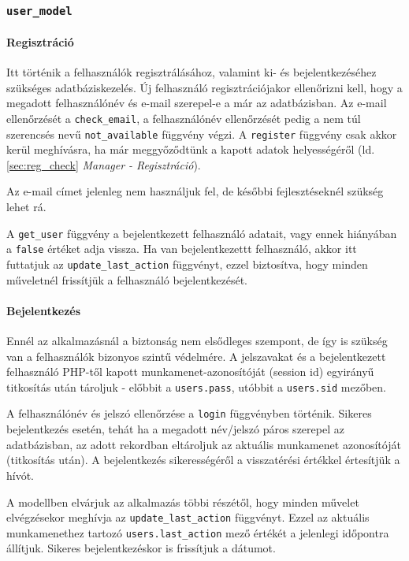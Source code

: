 \documentclass[12pt,a4paper,twoside]{article}
\begin{document}
\subsubsection{\texttt{user\_model}}

\paragraph{Regisztráció}
Itt történik a felhasználók regisztrálásához, valamint ki- és bejelentkezéséhez
szükséges adatbáziskezelés. Új felhasználó regisztrációjakor ellenőrizni
kell, hogy a megadott felhasználónév és e-mail szerepel-e a már az
adatbázisban. Az e-mail ellenőrzését a \texttt{check\_email}, a felhasználónév
ellenőrzését pedig a nem túl szerencsés nevű \texttt{not\_available} függvény
végzi. A \texttt{register} függvény csak akkor kerül meghívásra, ha már
meggyőződtünk a kapott adatok helyességéről (ld. \ref{sec:reg_check} \textit{Manager -
Regisztráció}).

Az e-mail címet jelenleg nem használjuk fel, de későbbi fejlesztéseknél szükség
lehet rá.

A \texttt{get\_user} függvény a bejelentkezett felhasználó adatait, vagy ennek
hiányában a \texttt{false} értéket adja vissza. Ha van bejelentkezettt
felhasználó, akkor itt futtatjuk az \texttt{update\_last\_action} függvényt,
ezzel biztosítva, hogy minden műveletnél frissítjük a felhasználó
bejelentkezését.

\paragraph{Bejelentkezés}
Ennél az alkalmazásnál a biztonság nem elsődleges szempont, de
így is szükség van a felhasználók bizonyos szintű védelmére. A jelszavakat és
a bejelentkezett felhasználó PHP-től kapott munkamenet-azonosítóját (session
id\cite{PHP-SID}) egyirányű titkosítás után tároljuk - előbbit a
\texttt{users.pass}, utóbbit a \texttt{users.sid} mezőben.

A felhasználónév és jelszó ellenőrzése a \texttt{login} függvényben
történik. Sikeres bejelentkezés esetén, tehát ha a megadott név/jelszó páros
szerepel az adatbázisban, az adott rekordban eltároljuk az aktuális munkamenet
azonosítóját (titkosítás után). A bejelentkezés sikerességéről a visszatérési
értékkel értesítjük a hívót.

A modellben elvárjuk az alkalmazás többi részétől, hogy minden művelet
elvégzésekor meghívja az \texttt{update\_last\_action} függvényt. Ezzel az
aktuális munkamenethez tartozó \texttt{users.last\_action} mező értékét a
jelenlegi időpontra állítjuk. Sikeres bejelentkezéskor is frissítjuk a dátumot.
\end{document}
